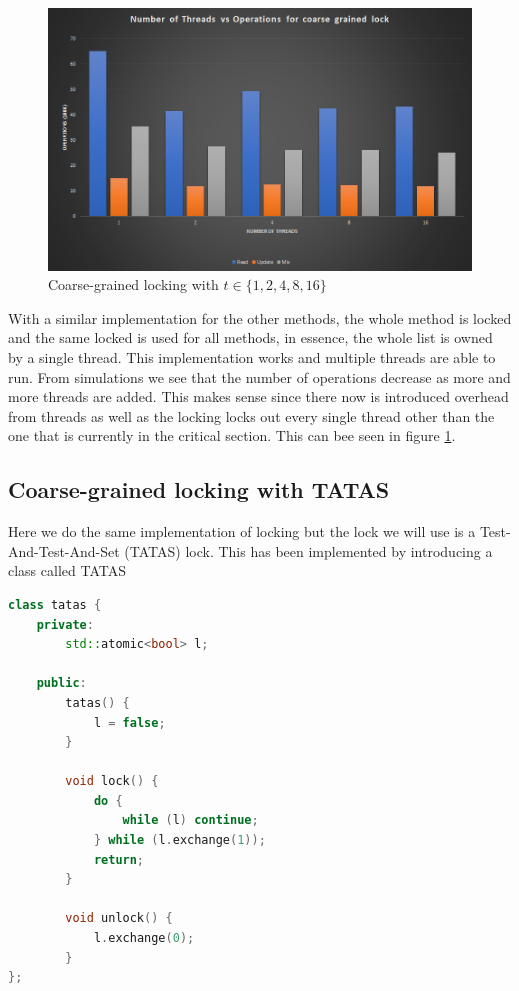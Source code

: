 \begin{figure}
    \centering
    \includegraphics[width=\linewidth]{Figures/coarsegrained.png}
    \caption{Coarse-grained locking with $t \in \{1, 2, 4, 8, 16\}$}
    \label{fig:coarsegrained}
\end{figure}

With a similar implementation for the other methods, the whole method is locked
and the same locked is used for all methods, in essence, the whole list is owned
by a single thread. This implementation works and multiple threads are able to 
run. From simulations we see that the number of operations decrease as more and
more threads are added. This makes sense since there now is introduced overhead
from threads as well as the locking locks out every single thread other than 
the one that is currently in the critical section. This can bee seen in figure
\ref{fig:coarsegrained}.

\subsection{Coarse-grained locking with TATAS}
Here we do the same implementation of locking but the lock we will use is a
Test-And-Test-And-Set (TATAS) lock. This has been implemented by introducing a 
class called TATAS

\begin{lstlisting}[language=C++, caption=TATAS Class]
class tatas {
	private:
		std::atomic<bool> l;

	public:
		tatas() {
			l = false;
		}

		void lock() {
			do {
				while (l) continue;
			} while (l.exchange(1));
			return;
		}

		void unlock() {
			l.exchange(0);
		}
};
\end{lstlisting}

